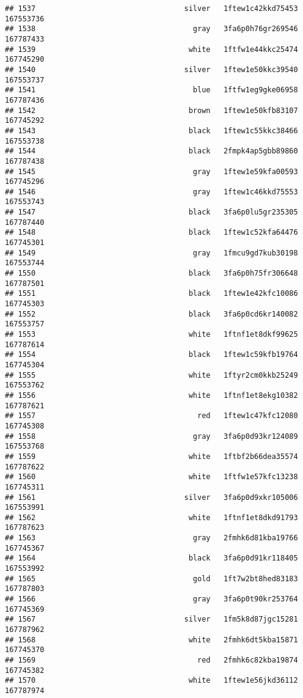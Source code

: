 \documentclass[
]{article}
\begin{document}
\begin{verbatim}
## 1537                                  silver   1ftew1c42kkd75453 167553736
## 1538                                    gray   3fa6p0h76gr269546 167787433
## 1539                                   white   1ftfw1e44kkc25474 167745290
## 1540                                  silver   1ftew1e50kkc39540 167553737
## 1541                                    blue   1ftfw1eg9gke06958 167787436
## 1542                                   brown   1ftew1e50kfb83107 167745292
## 1543                                   black   1ftew1c55kkc38466 167553738
## 1544                                   black   2fmpk4ap5gbb89860 167787438
## 1545                                    gray   1ftew1e59kfa00593 167745296
## 1546                                    gray   1ftew1c46kkd75553 167553743
## 1547                                   black   3fa6p0lu5gr235305 167787440
## 1548                                   black   1ftew1c52kfa64476 167745301
## 1549                                    gray   1fmcu9gd7kub30198 167553744
## 1550                                   black   3fa6p0h75fr306648 167787501
## 1551                                   black   1ftew1e42kfc10086 167745303
## 1552                                   black   3fa6p0cd6kr140082 167553757
## 1553                                   white   1ftnf1et8dkf99625 167787614
## 1554                                   black   1ftew1c59kfb19764 167745304
## 1555                                   white   1ftyr2cm0kkb25249 167553762
## 1556                                   white   1ftnf1et8ekg10382 167787621
## 1557                                     red   1ftew1c47kfc12080 167745308
## 1558                                    gray   3fa6p0d93kr124089 167553768
## 1559                                   white   1ftbf2b66dea35574 167787622
## 1560                                   white   1ftfw1e57kfc13238 167745311
## 1561                                  silver   3fa6p0d9xkr105006 167553991
## 1562                                   white   1ftnf1et8dkd91793 167787623
## 1563                                    gray   2fmhk6d81kba19766 167745367
## 1564                                   black   3fa6p0d91kr118405 167553992
## 1565                                    gold   1ft7w2bt8hed83183 167787803
## 1566                                    gray   3fa6p0t90kr253764 167745369
## 1567                                  silver   1fm5k8d87jgc15281 167787962
## 1568                                   white   2fmhk6dt5kba15871 167745370
## 1569                                     red   2fmhk6c82kba19874 167745382
## 1570                                   white   1ftew1e56jkd36112 167787974

\end{verbatim}
\end{document}
